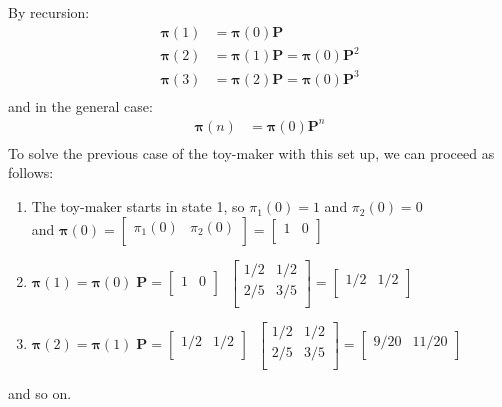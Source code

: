 \documentclass[\main/main.tex]{subfiles}
\begin{document}
\begin{small}
\noindent By recursion:
\begin{equation}
\begin{split}
   \bm{\pi}(1)&= \bm{\pi}(0) \bm{P} \\ 
   \bm{\pi }(2)&= \bm{\pi}(1) \bm{P} = \bm{\pi}(0) \bm{P}^2 \\ 
   \bm{\pi }(3)&= \bm{\pi}(2) \bm{P} = \bm{\pi}(0) \mathbf{P}^3\\
\end{split}
\end{equation}
and in the general case:
\begin{equation}
\begin{split}
   \bm{\pi}(n)&= \bm{\pi}(0) \mathbf{P}^n \\ 
\end{split}
\end{equation}
To solve the previous case of the toy-maker with this set up, we can proceed as follows:
\begin{enumerate}
    \item The toy-maker starts in state 1, so $\pi_1(0) = 1$ and $\pi_2(0) = 0$\\
    and $\bm{\pi}(0) = \begin{bmatrix}
    \pi_1(0) & \pi_2(0)\\
  \end{bmatrix}
 = \begin{bmatrix}
    1 & 0\\
  \end{bmatrix}$

    \item $\bm{\pi}(1) = \bm{\pi}(0) \; \mathbf{P} = 
  \begin{bmatrix}
    1 & 0\\
  \end{bmatrix}
 \; \;   \begin{bmatrix}
1/2 & 1/2\\
2/5 & 3/5\\
  \end{bmatrix} = \begin{bmatrix}
    1/2 & 1/2\\
  \end{bmatrix}$
  \item $\bm{\pi}(2) = \bm{\pi}(1) \; \mathbf{P} = 
  \begin{bmatrix}
    1/2 & 1/2\\
  \end{bmatrix}
 \; \;
 \begin{bmatrix}
    1/2 & 1/2\\
    2/5 & 3/5\\
  \end{bmatrix} = \begin{bmatrix}
    9/20 & 11/20\\
  \end{bmatrix}$
\end{enumerate}
and so on.\\


\end{small}
\end{document}
